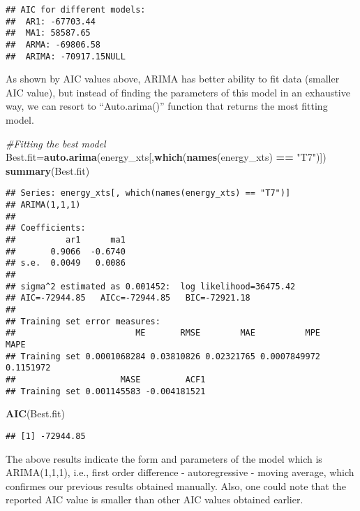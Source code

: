 \documentclass[]{article}
\newenvironment{Shaded}{\begin{snugshade}}{\end{snugshade}}
\newcommand{\KeywordTok}[1]{\textcolor[rgb]{0.13,0.29,0.53}{\textbf{#1}}}
\newcommand{\StringTok}[1]{\textcolor[rgb]{0.31,0.60,0.02}{#1}}
\newcommand{\CommentTok}[1]{\textcolor[rgb]{0.56,0.35,0.01}{\textit{#1}}}
\newcommand{\OperatorTok}[1]{\textcolor[rgb]{0.81,0.36,0.00}{\textbf{#1}}}
\newcommand{\NormalTok}[1]{#1}
\begin{document}
\begin{verbatim}
## AIC for different models:
##  AR1: -67703.44 
##  MA1: 58587.65 
##  ARMA: -69806.58 
##  ARIMA: -70917.15NULL
\end{verbatim}

As shown by AIC values above, ARIMA has better ability to fit data
(smaller AIC value), but instead of finding the parameters of this model
in an exhaustive way, we can resort to ``Auto.arima()'' function that
returns the most fitting model.

\begin{Shaded}
\begin{Highlighting}[]
\CommentTok{#Fitting the best model }
\NormalTok{Best.fit=}\KeywordTok{auto.arima}\NormalTok{(energy_xts[,}\KeywordTok{which}\NormalTok{(}\KeywordTok{names}\NormalTok{(energy_xts) }\OperatorTok{==}\StringTok{ "T7"}\NormalTok{)])}
\KeywordTok{summary}\NormalTok{(Best.fit)}
\end{Highlighting}
\end{Shaded}

\begin{verbatim}
## Series: energy_xts[, which(names(energy_xts) == "T7")] 
## ARIMA(1,1,1) 
## 
## Coefficients:
##          ar1      ma1
##       0.9066  -0.6740
## s.e.  0.0049   0.0086
## 
## sigma^2 estimated as 0.001452:  log likelihood=36475.42
## AIC=-72944.85   AICc=-72944.85   BIC=-72921.18
## 
## Training set error measures:
##                        ME       RMSE        MAE          MPE      MAPE
## Training set 0.0001068284 0.03810826 0.02321765 0.0007849972 0.1151972
##                     MASE         ACF1
## Training set 0.001145583 -0.004181521
\end{verbatim}

\begin{Shaded}
\begin{Highlighting}[]
\KeywordTok{AIC}\NormalTok{(Best.fit)}
\end{Highlighting}
\end{Shaded}

\begin{verbatim}
## [1] -72944.85
\end{verbatim}

The above results indicate the form and parameters of the model which is
ARIMA(1,1,1), i.e., first order difference - autoregressive - moving
average, which confirmes our previous results obtained manually. Also,
one could note that the reported AIC value is smaller than other AIC
values obtained earlier.
\end{document}

